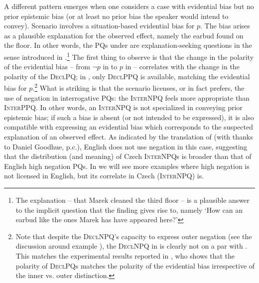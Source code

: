 \documentclass[output=paper,colorlinks,citecolor=brown]{langscibook}
\begin{document}
\noindent A different pattern emerges when one considers a case with evidential bias but no prior epistemic bias (or at least no prior bias the speaker would intend to convey). Scenario  involves a situation-based evidential bias for $p$. The bias arises as a plausible explanation for the observed effect, namely the earbud found on the floor. In other words, the PQs under  are explanation-seeking questions in the sense introduced in .\footnote{The explanation -- that Marek cleaned the third floor -- is a plausible answer to the implicit question that the finding gives rise to, namely `How can an earbud like the ones Marek has have appeared here?'} The first thing to observe is that the change in the polarity of the evidential bias -- from $\neg p$ in  to $p$ in  -- correlates with the change in the polarity of the \textsc{DeclPQ}; in , only \textsc{DeclPPQ} is available, matching the evidential bias for $p$.\footnote{Note that despite the \textsc{DeclNPQ}'s capacity to express outer negation (see the discussion around example ), the \textsc{DeclNPQ} in  is clearly not on a par with . This matches the experimental results reported in \citet{Stankova2023}, who shows that the polarity of \textsc{DeclPQ}s matches the polarity of the evidential bias irrespective of the inner vs. outer distinction.} What is striking is that the scenario licenses, or in fact prefers, the use of negation in interrogative PQs: the \textsc{InterNPQ} feels more appropriate than \textsc{InterPPQ}. In other words, an \textsc{InterNPQ} is not specialized in conveying prior epistemic bias; if such a bias is absent (or not intended to be expressed), it is also compatible with expressing an evidential bias which corresponds to the suspected explanation of an observed effect. As indicated by the translation of  (with thanks to Daniel Goodhue, p.c.), English does not use negation in this case, suggesting that the distribution (and meaning) of Czech \textsc{InterNPQ}s is broader than that of English high negation PQs. In  we will see more examples where high negation is not licensed in English, but its correlate in Czech (\textsc{InterNPQ}) is.
\end{document}
